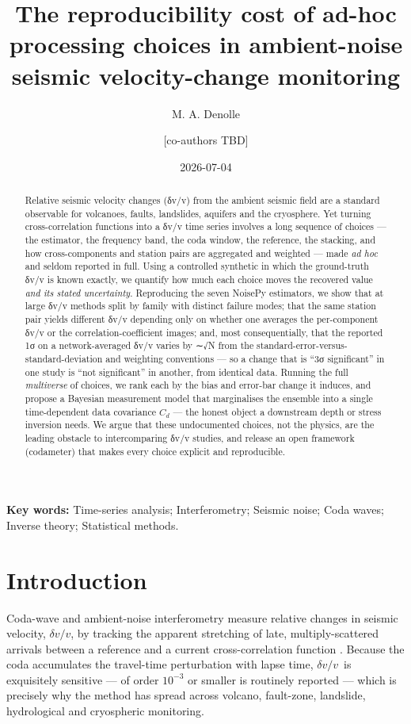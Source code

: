 \documentclass[
  11pt,
  letterpaper,
]{article}
\title{The reproducibility cost of ad-hoc processing choices in
ambient-noise seismic velocity-change monitoring}
\author{M. A. Denolle \and {[}co-authors TBD{]}}
\date{2026-07-04}
\providecommand{\dvv}{\ensuremath{\delta v/v}}
\begin{document}
\maketitle
\begin{abstract}
Relative seismic velocity changes (δv/v) from the ambient seismic field
are a standard observable for volcanoes, faults, landslides, aquifers
and the cryosphere. Yet turning cross-correlation functions into a δv/v
time series involves a long sequence of choices --- the estimator, the
frequency band, the coda window, the reference, the stacking, and how
cross-components and station pairs are aggregated and weighted --- made
\emph{ad hoc} and seldom reported in full. Using a controlled synthetic
in which the ground-truth δv/v is known exactly, we quantify how much
each choice moves the recovered value \emph{and its stated uncertainty}.
Reproducing the seven NoisePy estimators, we show that at large δv/v
methods split by family with distinct failure modes; that the same
station pair yields different δv/v depending only on whether one
averages the per-component δv/v or the correlation-coefficient images;
and, most consequentially, that the reported 1σ on a network-averaged
δv/v varies by ∼√N from the standard-error-versus-standard-deviation and
weighting conventions --- so a change that is ``3σ significant'' in one
study is ``not significant'' in another, from identical data. Running
the full \emph{multiverse} of choices, we rank each by the bias and
error-bar change it induces, and propose a Bayesian measurement model
that marginalises the ensemble into a single time-dependent data
covariance \(C_d\) --- the honest object a downstream depth or stress
inversion needs. We argue that these undocumented choices, not the
physics, are the leading obstacle to intercomparing δv/v studies, and
release an open framework (codameter) that makes every choice explicit
and reproducible.
\end{abstract}


\vspace{0.5em}\noindent\textbf{Key words:} Time-series analysis; Interferometry; Seismic noise; Coda waves; Inverse theory; Statistical methods.\vspace{0.5em}

\section{Introduction}\label{sec:intro}

Coda-wave and ambient-noise interferometry measure relative changes in
seismic velocity, \dvv, by tracking the apparent stretching of late,
multiply-scattered arrivals between a reference and a current
cross-correlation function \citep{Snieder2002, SensSchonfelder2006}.
Because the coda accumulates the travel-time perturbation with lapse
time, \dvv~is exquisitely sensitive --- of order \(10^{-3}\) or smaller
is routinely reported --- which is precisely why the method has spread
across volcano, fault-zone, landslide, hydrological and cryospheric
monitoring.
\end{document}
